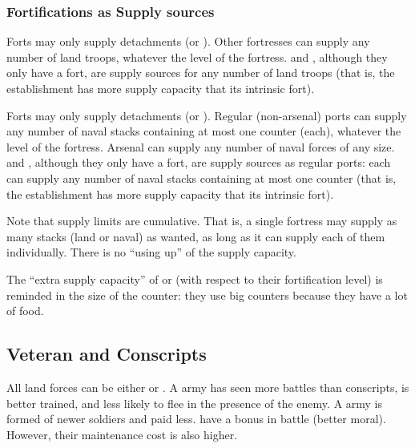 \subsubsection{Fortifications as Supply sources}
\bparag Forts may only supply detachments (\LD or \LDE).
\bparag Other fortresses can supply any number of land troops, whatever the
level of the fortress.
\bparag \COL and \TP, although they only have a fort, are supply sources for
any number of land troops (that is, the establishment has more supply capacity
that its intrinsic fort).

\bparag Forts may only supply detachments (\ND or \NDE).
\bparag Regular (non-arsenal) ports can supply any number of naval stacks
containing at most one \FLEET counter (each), whatever the level of the
fortress.
\bparag Arsenal can supply any number of naval forces of any size.
\bparag \COL and \TP, although they only have a fort, are supply sources as
regular ports: each can supply any number of naval stacks containing at most
one \FLEET counter (that is, the establishment has more supply capacity that
its intrinsic fort).

\begin{designnote}
  Note that supply limits are cumulative. That is, a single fortress may
  supply as many stacks (land or naval) as wanted, as long as it can supply
  each of them individually. There is no ``using up'' of the supply capacity.

  The ``extra supply capacity'' of \COL or \TP (with respect to their
  fortification level) is reminded in the size of the counter: they use big
  counters because they have a lot of food.
\end{designnote}



\subsection{Veteran and Conscripts}
\label{chMilitary:Veteran Conscripts}

 All land forces can be either
 or . A  army has seen more
battles than conscripts, is better trained, and less likely to flee in the
presence of the enemy. A  army is formed of newer soldiers
and paid less.
\bparag {} have a bonus in battle (better moral). However, their
maintenance cost is also higher.

